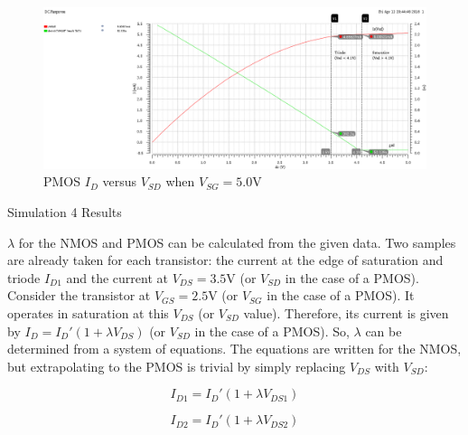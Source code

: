 \FloatBarrier

\FloatBarrier

\begin{figure}[h!]
	\centering
	\includegraphics[scale=0.30]{../images/id_vs_vds_vgs_is_5_pmos.PNG}
	\caption{PMOS $I_{D}$ versus $V_{SD}$ when $V_{SG} = 5.0$\si{\volt}}
	\label{fig:id_vs_vds_vgs_is_5_pmos}
\end{figure}

\FloatBarrier

\FloatBarrier

\begin{table}[h!]
	\centering
	\caption{Simulation 4 Results}
	\label{tab:sim4_results}
\end{table}

\FloatBarrier

$\lambda$ for the NMOS and PMOS can be calculated from the given data.
Two samples are already taken for each transistor: the current at the edge of saturation and triode $I_{D1}$ and the current at $V_{DS} = 3.5$\si{\volt} (or $V_{SD}$ in the case of a PMOS).
Consider the transistor at $V_{GS} = 2.5$\si{\volt} (or $V_{SG}$ in the case of a PMOS).
It operates in saturation at this $V_{DS}$ (or $V_{SD}$ value).
Therefore, its current is given by $I_{D} = I_{D}' ( 1 + \lambda V_{DS} )$ (or $V_{SD}$ in the case of a PMOS).
So, $\lambda$ can be determined from a system of equations.
The equations are written for the NMOS, but extrapolating to the PMOS is trivial by simply replacing $V_{DS}$ with $V_{SD}$:

\begin{equation}
	\label{eq:lambda_eqn_1}
	I_{D1} = I_{D}' ( 1 + \lambda V_{DS1} )
\end{equation}

\begin{equation}
	\label{eq:lambda_eqn_2}
	I_{D2} = I_{D}' ( 1 + \lambda V_{DS2} )
\end{equation}

